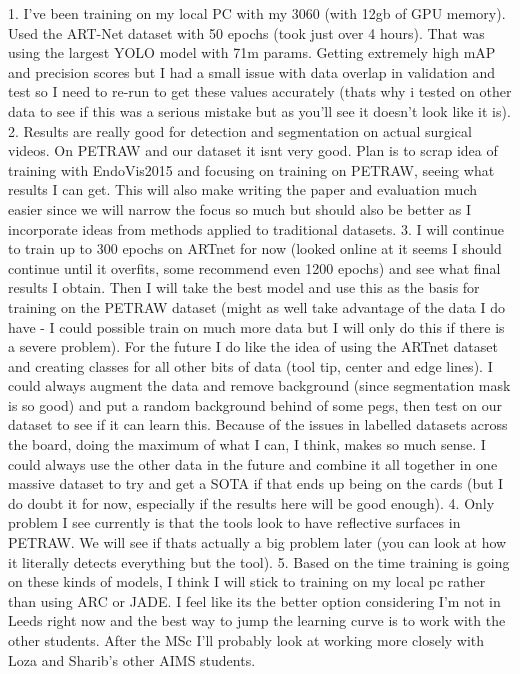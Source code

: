 1.	I've been training on my local PC with my 3060 (with 12gb of GPU memory). Used the ART-Net dataset with 50 epochs (took just over 4 hours). That was using the largest YOLO model with 71m params. Getting extremely high mAP and precision scores but I had a small issue with data overlap in validation and test so I need to re-run to get these values accurately (thats why i tested on other data to see if this was a serious mistake but as you'll see it doesn't look like it is).
2.	Results are really good for detection and segmentation on actual surgical videos. On PETRAW and our dataset it isnt very good. Plan is to scrap idea of training with EndoVis2015 and focusing on training on PETRAW, seeing what results I can get. This will also make writing the paper and evaluation much easier since we will narrow the focus so much but should also be better as I incorporate ideas from methods applied to traditional datasets. 
3.	I will continue to train up to 300 epochs on ARTnet for now (looked online at it seems I should continue until it overfits, some recommend even 1200 epochs) and see what final results I obtain. Then I will take the best model and use this as the basis for training on the PETRAW dataset (might as well take advantage of the data I do have - I could possible train on much more data but I will only do this if there is a severe problem). For the future I do like the idea of using the ARTnet dataset and creating classes for all other bits of data (tool tip, center and edge lines). I could always augment the data and remove background (since segmentation mask is so good) and put a random background behind of some pegs, then test on our dataset to see if it can learn this. Because of the issues in labelled datasets across the board, doing the maximum of what I can, I think, makes so much sense. I could always use the other data in the future and combine it all together in one massive dataset to try and get a SOTA if that ends up being on the cards (but I do doubt it for now, especially if the results here will be good enough).
4.	Only problem I see currently is that the tools look to have reflective surfaces in PETRAW. We will see if thats actually a big problem later (you can look at how it literally detects everything but the tool).
5.	Based on the time training is going on these kinds of models, I think I will stick to training on my local pc rather than using ARC or JADE. I feel like its the better option considering I'm not in Leeds right now and the best way to jump the learning curve is to work with the other students. After the MSc I'll probably look at working more closely with Loza and Sharib's other AIMS students. 
